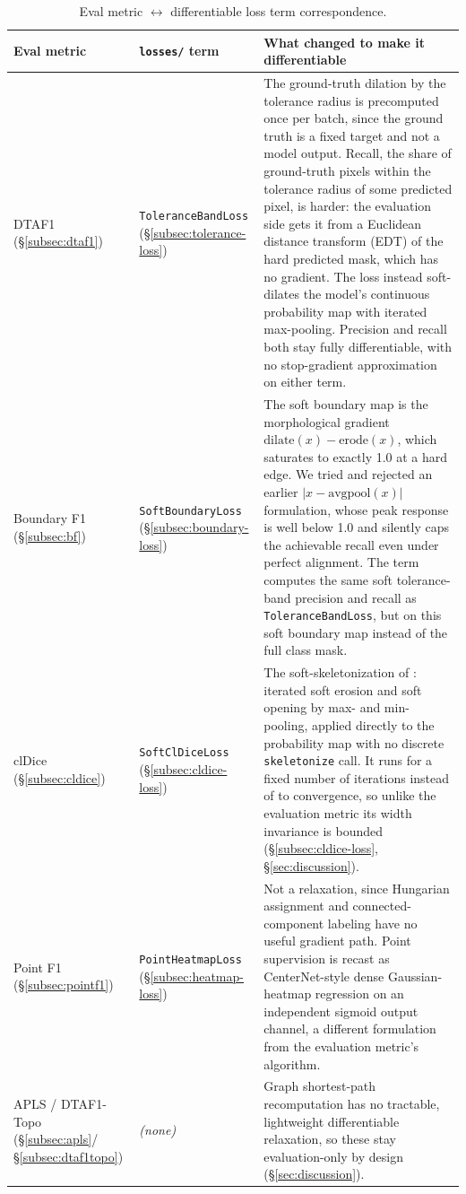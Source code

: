 \begin{table}
  \caption{Eval metric $\leftrightarrow$ differentiable loss term correspondence.}
  \label{tab:correspondence}
  \begin{tabular}{@{}>{\raggedright\arraybackslash}p{2.7cm}>{\raggedright\arraybackslash}p{2.7cm}>{\raggedright\arraybackslash}p{10.5cm}@{}}
    \toprule
    Eval metric & \texttt{losses/} term & What changed to make it differentiable \\
    \midrule
    DTAF1 (\S\ref{subsec:dtaf1}) & \texttt{ToleranceBandLoss} (\S\ref{subsec:tolerance-loss}) &
      The ground-truth dilation by the tolerance radius is precomputed once per batch, since the
      ground truth is a fixed target and not a model output. Recall, the share of ground-truth
      pixels within the tolerance radius of some predicted pixel, is harder: the evaluation side
      gets it from a Euclidean distance transform (EDT) of the hard predicted mask, which has no
      gradient. The loss instead soft-dilates the model's continuous probability map with
      iterated max-pooling. Precision and recall both stay fully differentiable, with no
      stop-gradient approximation on either term. \\
    Boundary F1 (\S\ref{subsec:bf}) & \texttt{SoftBoundaryLoss} (\S\ref{subsec:boundary-loss}) &
      The soft boundary map is the morphological gradient $\mathrm{dilate}(x) - \mathrm{erode}(x)$,
      which saturates to exactly 1.0 at a hard edge. We tried and rejected an earlier
      $|x-\mathrm{avgpool}(x)|$ formulation, whose peak response is well below 1.0 and silently
      caps the achievable recall even under perfect alignment. The term computes the
      same soft tolerance-band precision and recall as \texttt{ToleranceBandLoss}, but on this soft
      boundary map instead of the full class mask. \\
    clDice (\S\ref{subsec:cldice}) & \texttt{SoftClDiceLoss} (\S\ref{subsec:cldice-loss}) &
      The soft-skeletonization of \citet{shit2021cldice}: iterated soft erosion and soft opening by max- and
      min-pooling, applied directly to the probability map with no discrete
      \texttt{skeletonize} call. It runs for a fixed number of iterations instead of to
      convergence, so unlike the evaluation metric its width invariance is bounded
      (\S\ref{subsec:cldice-loss}, \S\ref{sec:discussion}). \\
    Point F1 (\S\ref{subsec:pointf1}) & \texttt{PointHeatmapLoss} (\S\ref{subsec:heatmap-loss}) &
      Not a relaxation, since Hungarian assignment and connected-component labeling have no
      useful gradient path. Point supervision is recast as CenterNet-style dense Gaussian-heatmap
      regression on an independent sigmoid output channel, a different formulation from the
      evaluation metric's algorithm. \\
    APLS / DTAF1-Topo (\S\ref{subsec:apls}/\S\ref{subsec:dtaf1topo}) & \emph{(none)} & Graph
      shortest-path recomputation has no tractable, lightweight differentiable relaxation, so
      these stay evaluation-only by design (\S\ref{sec:discussion}). \\
    \bottomrule
  \end{tabular}
\end{table}

